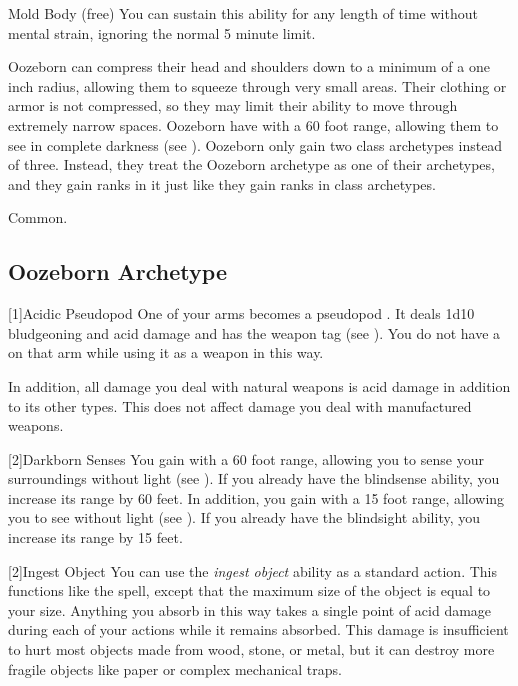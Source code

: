 \begin{itemize}
\begin{sustainability}{Mold Body}{ (free)}
                You can sustain this ability for any length of time without mental strain, ignoring the normal 5 minute limit.
            \end{sustainability}
         Oozeborn can compress their head and shoulders down to a minimum of a one inch radius, allowing them to squeeze through very small areas.
            Their clothing or armor is not compressed, so they may limit their ability to move through extremely narrow spaces.
         Oozeborn have  with a 60 foot range, allowing them to see in complete darkness (see ).
         Oozeborn only gain two class archetypes instead of three.
            Instead, they treat the Oozeborn archetype as one of their archetypes, and they gain ranks in it just like they gain ranks in class archetypes.
    \end{itemize}
     Common.
    
    \subsection{Oozeborn Archetype}

        [1]{Acidic Pseudopod} One of your arms becomes a pseudopod .
        It deals 1d10 bludgeoning and acid damage and has the  weapon tag (see ).
        You do not have a  on that arm while using it as a weapon in this way.

        In addition, all damage you deal with natural weapons is acid damage in addition to its other types.
        This does not affect damage you deal with manufactured weapons.

        [2]{Darkborn Senses} You gain  with a 60 foot range, allowing you to sense your surroundings without light (see ).
        If you already have the blindsense ability, you increase its range by 60 feet.
        In addition, you gain  with a 15 foot range, allowing you to see without light (see ).
        If you already have the blindsight ability, you increase its range by 15 feet.

        [2]{Ingest Object} You can use the \textit{ingest object} ability as a standard action.
        This functions like the  spell, except that the maximum size of the object is equal to your size.
        Anything you absorb in this way takes a single point of  acid damage during each of your actions while it remains absorbed.
        This damage is insufficient to hurt most objects made from wood, stone, or metal, but it can destroy more fragile objects like paper or complex mechanical traps.

